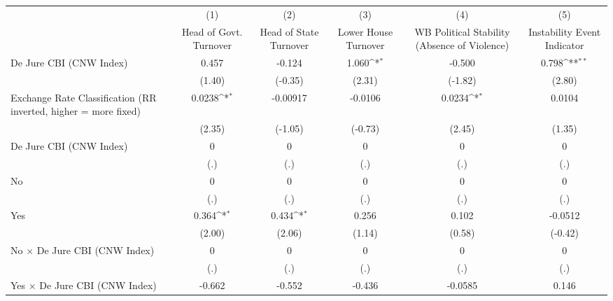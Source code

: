 {
\def\sym#1{\ifmmode^{#1}\else\(^{#1}\)\fi}
\begin{tabular}{l*{5}{c}}
\hline\hline
                &\multicolumn{1}{c}{(1)}&\multicolumn{1}{c}{(2)}&\multicolumn{1}{c}{(3)}&\multicolumn{1}{c}{(4)}&\multicolumn{1}{c}{(5)}\\
                &\multicolumn{1}{c}{Head of Govt. Turnover}&\multicolumn{1}{c}{Head of State Turnover}&\multicolumn{1}{c}{Lower House Turnover}&\multicolumn{1}{c}{WB Political Stability (Absence of Violence)}&\multicolumn{1}{c}{Instability Event Indicator}\\
\hline
De Jure CBI (CNW Index)&    0.457         &   -0.124         &    1.060\sym{*}  &   -0.500         &    0.798\sym{**} \\
                &   (1.40)         &  (-0.35)         &   (2.31)         &  (-1.82)         &   (2.80)         \\
[1em]
Exchange Rate Classification (RR inverted, higher = more fixed)&   0.0238\sym{*}  & -0.00917         &  -0.0106         &   0.0234\sym{*}  &   0.0104         \\
                &   (2.35)         &  (-1.05)         &  (-0.73)         &   (2.45)         &   (1.35)         \\
[1em]
De Jure CBI (CNW Index)&        0         &        0         &        0         &        0         &        0         \\
                &      (.)         &      (.)         &      (.)         &      (.)         &      (.)         \\
[1em]
No              &        0         &        0         &        0         &        0         &        0         \\
                &      (.)         &      (.)         &      (.)         &      (.)         &      (.)         \\
[1em]
Yes             &    0.364\sym{*}  &    0.434\sym{*}  &    0.256         &    0.102         &  -0.0512         \\
                &   (2.00)         &   (2.06)         &   (1.14)         &   (0.58)         &  (-0.42)         \\
[1em]
No $\times$ De Jure CBI (CNW Index)&        0         &        0         &        0         &        0         &        0         \\
                &      (.)         &      (.)         &      (.)         &      (.)         &      (.)         \\
[1em]
Yes $\times$ De Jure CBI (CNW Index)&   -0.662         &   -0.552         &   -0.436         &  -0.0585         &    0.146         \\

\end{tabular}}
